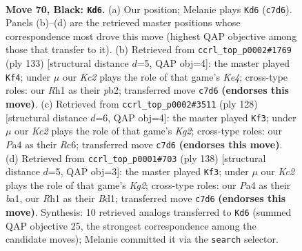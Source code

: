 \documentclass[11pt]{article}
\begin{document}
\clearpage

\begin{figure}[p]\centering
\begin{subfigure}{0.46\textwidth}\centering
\resizebox{\linewidth}{!}{%
\newchessgame
\chessboard[
  setfen={8/2k5/2p5/3p4/p7/8/2K5/7r b - - 3 70},
  showmover=false,
  pgfstyle=straightmove, color=movearrow, markmove={c7-d6}
]}
\caption{}
\end{subfigure}\hfill
\begin{subfigure}{0.46\textwidth}\centering
\resizebox{\linewidth}{!}{%
\newchessgame
\chessboard[
  setfen={8/8/8/4kp2/6p1/1p1K4/1P6/1N6 b - - 1 67},
  showmover=false,
  pgfstyle=straightmove, color=movearrow, markmove={e5-f4}
]}
\caption{}
\end{subfigure}
\\[4pt]
\begin{subfigure}{0.46\textwidth}\centering
\resizebox{\linewidth}{!}{%
\newchessgame
\chessboard[
  setfen={8/5k2/2R5/5p2/5P2/6P1/6K1/1r6 w - - 7 65},
  showmover=false,
  pgfstyle=straightmove, color=movearrow, markmove={g2-f3}
]}
\caption{}
\end{subfigure}\hfill
\begin{subfigure}{0.46\textwidth}\centering
\resizebox{\linewidth}{!}{%
\newchessgame
\chessboard[
  setfen={8/8/4k3/8/5P2/6P1/6K1/b2B4 w - - 7 70},
  showmover=false,
  pgfstyle=straightmove, color=movearrow, markmove={g2-f3}
]}
\caption{}
\end{subfigure}
\caption{\textbf{Move 70, Black: \texttt{Kd6}.} (a) Our position; Melanie plays \texttt{Kd6} (\texttt{c7d6}). Panels (b)--(d) are the retrieved master positions whose correspondence most drove this move (highest QAP objective among those that transfer to it). (b) Retrieved from \texttt{ccrl\_top\_p0002\#1769} (ply 133) [structural distance $d$=5, QAP obj=4]: the master played \texttt{Kf4}; under $\mu$ our \emph{Kc2} plays the role of that game's \emph{Ke4}; cross-type roles: our \emph{R}h1 as their \emph{p}b2; transferred move \texttt{c7d6} \textbf{(endorses this move)}. (c) Retrieved from \texttt{ccrl\_top\_p0002\#3511} (ply 128) [structural distance $d$=6, QAP obj=4]: the master played \texttt{Kf3}; under $\mu$ our \emph{Kc2} plays the role of that game's \emph{Kg2}; cross-type roles: our \emph{P}a4 as their \emph{R}c6; transferred move \texttt{c7d6} \textbf{(endorses this move)}. (d) Retrieved from \texttt{ccrl\_top\_p0001\#703} (ply 138) [structural distance $d$=5, QAP obj=3]: the master played \texttt{Kf3}; under $\mu$ our \emph{Kc2} plays the role of that game's \emph{Kg2}; cross-type roles: our \emph{P}a4 as their \emph{b}a1, our \emph{R}h1 as their \emph{B}d1; transferred move \texttt{c7d6} \textbf{(endorses this move)}. Synthesis: 10 retrieved analogs transferred to \texttt{Kd6} (summed QAP objective 25, the strongest correspondence among the candidate moves); Melanie committed it via the \texttt{search} selector.}
\label{fig:thought-m139}
\end{figure}
\end{document}
